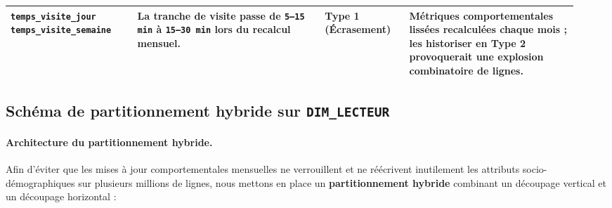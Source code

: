 \documentclass[a4paper,12pt]{article}
\begin{document}
\begin{center}
\begin{tabular}{@{}p{0.21\linewidth}p{0.31\linewidth}p{0.14\linewidth}p{0.28\linewidth}@{}}
  \addlinespace
  \texttt{temps\_visite\_jour} \newline \texttt{temps\_visite\_semaine} & La tranche de visite passe de \texttt{5--15 min} à \texttt{15--30 min} lors du recalcul mensuel. & \textbf{Type 1} \newline (Écrasement) & Métriques comportementales lissées recalculées chaque mois ; les historiser en Type 2 provoquerait une explosion combinatoire de lignes. \\
  \bottomrule
\end{tabular}
\end{center}

\subsection{Schéma de partitionnement hybride sur \texttt{DIM\_LECTEUR}}

\paragraph{Architecture du partitionnement hybride.}
Afin d'éviter que les mises à jour comportementales mensuelles ne verrouillent et ne réécrivent inutilement les attributs socio-démographiques sur plusieurs millions de lignes, nous mettons en place un \textbf{partitionnement hybride} combinant un découpage vertical et un découpage horizontal :
\end{document}
